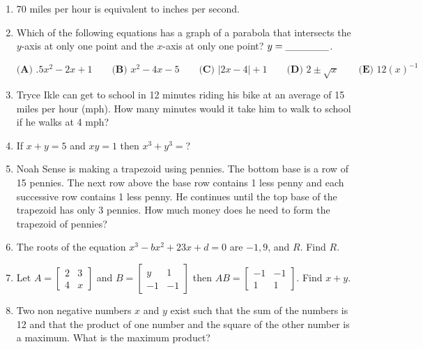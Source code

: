 \documentclass[../uilmath.tex]{subfiles}
\begin{document}
\begin{enumerate}[label=\bfseries\arabic*.]
        \item %
        70 miles per hour is equivalent to \blank inches per second.

        \item %
        Which of the following equations has a graph of a parabola that intersects the $y$-axis at only one point and the $x$-axis at only one point? $y=\_\_\_\_\_\_$.
        
        $\textbf{(A) } .5x^2-2x+1 \qquad \textbf{(B) } x^2-4x-5 \qquad \textbf{(C) } |2x-4|+1 \qquad \textbf{(D) } 2\pm \sqrt{x} \qquad \textbf{(E) } 12(x)^{-1}$

        \item %
        Tryce Ikle can get to school in 12 minutes riding his bike at an average of 15 miles per hour (mph). How many minutes would it take him to walk to school if he walks at 4 mph?

        \item %
        If $x+y=5$ and $xy=1$ then $x^3+y^3=$?

        \item %
        Noah Sense is making a trapezoid using pennies. The bottom base is a row of 15 pennies. The next row above the base row 
        contains 1 less penny and each successive row contains 1 less penny. He continues until the top base of the trapezoid has only 3 pennies.
        How much money does he need to form the trapezoid of pennies?

        \item %
        The roots of the equation $x^3-bx^2+23x+d=0$ are $-1,9$, and $R$. Find $R$.

        \item %
        Let $A = \begin{bmatrix}
            2  & 3\\
            4 & x
            \end{bmatrix}$ and $B=\begin{bmatrix}
                y & 1\\
                -1 & -1 
            \end{bmatrix}$ then $AB = \begin{bmatrix}
                -1 & -1 \\
                1 & 1
            \end{bmatrix}$. Find $x+y$.

        \item %
        Two non negative numbers $x$ and $y$ exist such that the sum of the numbers is 12 and that the product of 
        one number and the square of the other number is a maximum. What is the maximum product?


\end{enumerate}
\end{document}

